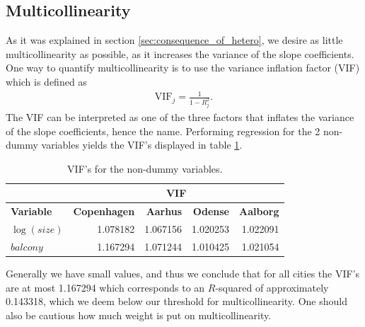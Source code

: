 \subsection{Multicollinearity}
As it was explained in section \ref{sec:consequence_of_hetero}, we desire as little multicollinearity as possible, as it increases the variance of the slope coefficients.
One way to quantify multicollinearity is
to use the variance inflation factor (VIF) which is defined as
\begin{align*}
    \text{VIF}_j = \frac{1}{1 - R^2_j}.
\end{align*}
The VIF can be interpreted as one of the three factors that inflates the variance of the slope coefficients, hence the name.
Performing regression for the 2 non-dummy variables yields the VIF's displayed in table \ref{tbl:vif}.
\begin{table}[H]
    \centering
    \begin{tabular}{lrrrr}
        \toprule
        & \multicolumn{4}{c}{\textbf{VIF}} \\
        \midrule
        \textbf{Variable} & \textbf{Copenhagen} & \textbf{Aarhus} & \textbf{Odense} & \textbf{Aalborg} \\
        \midrule
        $\log(size)$                & 1.078182 & 1.067156 & 1.020253 & 1.022091 \\
        $balcony$                   & 1.167294 & 1.071244 & 1.010425 & 1.021054 \\
        \bottomrule
    \end{tabular}
    \caption{VIF's for the non-dummy variables.}
    \label{tbl:vif}
\end{table}
Generally we have small values, and
thus we conclude that for all cities the VIF's are at most 1.167294 which corresponds to an $R$-squared of approximately 0.143318, which we deem below our threshold for multicollinearity.
One should also be cautious how much weight is put on multicollinearity.

